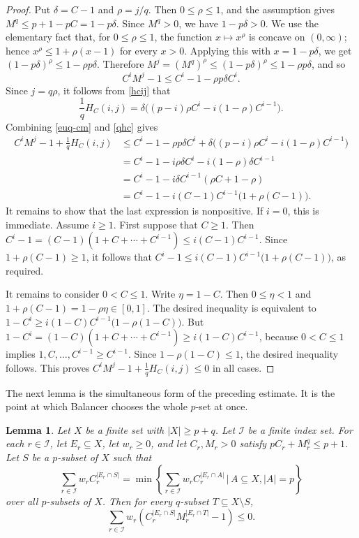 \documentclass[twoside,12pt]{article}
\numberwithin{equation}{section}
\newtheorem{lemma}[theorem]{Lemma}
\begin{document}
\begin{proof}
Put $\delta=C-1$ and $\rho=j/q$.  Then $0\le \rho\le1$, and the assumption gives $M^q\le p+1-pC=1-p\delta$. Since $M^q>0$, we have $1-p\delta>0$. We use the elementary fact that, for $0\le\rho\le1$, the function $x\mapsto x^\rho$ is concave on $(0,\infty)$; hence $x^\rho\le 1+\rho(x-1)$ for every $x>0$.  Applying this with $x=1-p\delta$, we get $(1-p\delta)^\rho\le 1-\rho p\delta$. Therefore $M^j=(M^q)^\rho\le (1-p\delta)^\rho\le 1-\rho p\delta$, and so 
\begin{equation}\label{euq-cm}
C^iM^j-1\le C^i-1-\rho p\delta C^i.
\end{equation}
Since $j=q\rho$, it follows from \eqref{hcij} that 
\begin{equation}\label{qhc}
\frac1qH_C(i,j)=\delta\bigl((p-i)\rho C^i-i(1-\rho)C^{i-1}\bigr). 
\end{equation}
Combining \eqref{euq-cm} and \eqref{qhc} gives
\[
\begin{aligned}
C^iM^j-1+\frac1qH_C(i,j)
&\le C^i-1-\rho p\delta C^i
+\delta\bigl((p-i)\rho C^i-i(1-\rho)C^{i-1}\bigr)  \\
&= C^i-1-i\rho\delta C^i-i(1-\rho)\delta C^{i-1}  \\
&= C^i-1-i\delta C^{i-1}(\rho C+1-\rho)  \\
&= C^i-1-i(C-1)C^{i-1}\bigl(1+\rho(C-1)\bigr).
\end{aligned}
\]
It remains to show that the last expression is nonpositive. If $i=0$, this is immediate. Assume $i\ge1$.
First suppose that $C\ge1$. Then $C^i-1=(C-1)(1+C+\cdots+C^{i-1})\le i(C-1)C^{i-1}$. Since $1+\rho(C-1)\ge1$, it follows that $C^i-1\le i(C-1)C^{i-1}\bigl(1+\rho(C-1)\bigr)$, as required.

It remains to consider $0<C\le1$.  Write $\eta=1-C$. Then $0\le\eta<1$ and $1+\rho(C-1)=1-\rho\eta\in[0,1]$. The desired inequality is equivalent to $1-C^i\ge i(1-C)C^{i-1}\bigl(1-\rho(1-C)\bigr)$. But $1-C^i=(1-C)(1+C+\cdots+C^{i-1})\ge i(1-C)C^{i-1}$, because $0<C\le1$ implies $1,C,\ldots,C^{i-1}\ge C^{i-1}$. Since $1-\rho(1-C)\le1$, the desired inequality follows. This proves $C^iM^j-1+\frac1qH_C(i,j)\le0$ in all cases.
\end{proof}


The next lemma is the simultaneous form of the preceding estimate. It is the point at which Balancer chooses the whole $p$-set at once.

\begin{lemma}\label{lem2-2}
Let $X$ be a finite set with $|X|\ge p+q$.  Let $\mathcal I$ be a finite index set. For each $r\in\mathcal I$, let $E_r\subseteq X$, let $w_r\ge0$, and let $C_r,M_r>0$ satisfy
$pC_r+M_r^q\le p+1$.
Let $S$ be a $p$-subset of $X$ such that
\begin{equation}
\label{eq:selection-objective}
\sum_{r\in\mathcal I}w_r C_r^{|E_r\cap S|}=\min \left\{\sum_{r\in\mathcal I}w_r C_r^{|E_r\cap A|}\,|\, A\subseteq X, |A|=p\right\}
\end{equation}
over all $p$-subsets of $X$.  Then for every $q$-subset
$T\subseteq X\setminus S$,
\[
        \sum_{r\in\mathcal I}
        w_r\left(C_r^{|E_r\cap S|}M_r^{|E_r\cap T|}-1\right)
        \le0.
\]
\end{lemma}
\end{document}
